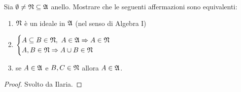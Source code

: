 \documentclass[../EserciziIstituzioniAnalisi.tex]{subfiles}
\begin{document}
\begin{exercise}[2016-10-13]
  Sia $\emptyset \neq \mathfrak N \subseteq \mathfrak A$ anello.
  Mostrare che le seguenti affermazioni sono equivalenti:
  \begin{enumerate}
  \item $\mathfrak N$ \`e un ideale in $\mathfrak A$ (nel senso di Algebra I)    
  \item $\displaystyle
    \begin{cases}
      A \subseteq B \in \mathfrak N,\ A \in \mathfrak A \Rightarrow A \in \mathfrak N \\
      A, B \in \mathfrak N \Rightarrow A \cup B \in \mathfrak N
    \end{cases}$
  \item se $A \in \mathfrak A$ e $B, C \in \mathfrak N$ allora $A \in \mathfrak A$.
  \end{enumerate}
\end{exercise}
\begin{proof}
  Svolto da Ilaria.  
\end{proof}
\end{document}
